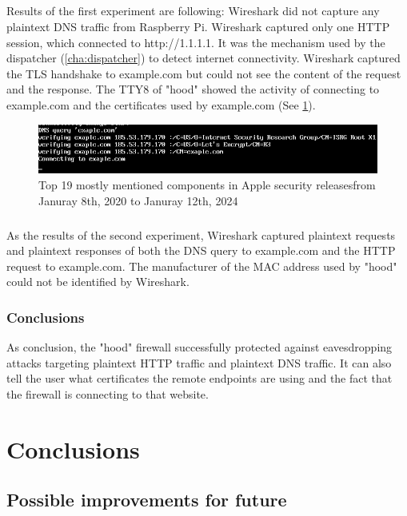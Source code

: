 \documentclass[mscthesis]{usiinfthesis}
\begin{document}
\paragraph{}
Results of the first experiment are following: Wireshark did not capture any plaintext DNS traffic from Raspberry Pi. Wireshark captured only one HTTP session, which connected to http://1.1.1.1. It was the mechanism used by the dispatcher (\cref{cha:dispatcher}) to detect internet connectivity. Wireshark captured the TLS handshake to example.com but could not see the content of the request and the response. The TTY8 of "hood" showed the activity of connecting to example.com and the certificates used by example.com (See \cref{fig:hood-tty-output}).
\begin{figure}[H]
  \includegraphics[width=\textwidth]{penetration_test/hoodcurlexample_tty_output_cropped.png}
  \caption{Top 19 mostly mentioned components in Apple security releases\newline from Januray 8th, 2020 to Januray 12th, 2024}
  \label{fig:hood-tty-output}
\end{figure}
\paragraph{}
As the results of the second experiment, Wireshark captured plaintext requests and plaintext responses of both the DNS query to example.com and the HTTP request to example.com. The manufacturer of the MAC address used by "hood" could not be identified by Wireshark.

\subsection{Conclusions}
As conclusion, the "hood" firewall successfully protected against eavesdropping attacks targeting plaintext HTTP traffic and plaintext DNS traffic. It can also tell the user what certificates the remote endpoints are using and the fact that the firewall is connecting to that website.

\chapter{Conclusions}

\section{Possible improvements for future}
\end{document}
